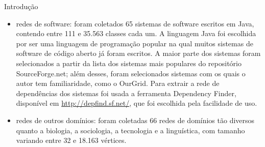 \begin{section}{Introdução}
\begin{itemize}
	\item redes de software: foram coletados 65 sistemas de software escritos em Java, contendo entre 111 e 35.563 classes cada um. A linguagem Java foi escolhida por ser uma linguagem de programação popular na qual muitos sistemas de software de código aberto já foram escritos. A maior parte dos sistemas foram selecionados a partir da lista dos sistemas mais populares do repositório SourceForge.net; além desses, foram selecionados sistemas com os quais o autor tem familiaridade, como o OurGrid. Para extrair a rede de dependências dos sistemas foi usada a ferramenta Dependency Finder, disponível em \url{http://depfind.sf.net/}, que foi escolhida pela facilidade de uso.
	\item redes de outros domínios: foram coletadas 66 redes de domínios tão diversos quanto a biologia, a sociologia, a tecnologia e a linguística, com tamanho variando entre 32 e 18.163 vértices.
\end{itemize}

\end{section}

